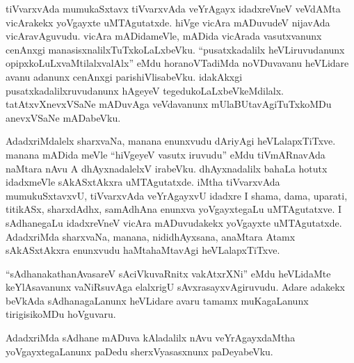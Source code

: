 tiVvarxvAda mumukaSxtavx tiVvarxvAda veYrAgayx idadxreVneV veVdAMta vicArakekx yoVgayxte uMTAgutatxde. hiVge vicAra mADuvudeV nijavAda vicAravAguvudu. vicAra mADidameVle, mADida vicArada vasutxvanunx cenAnxgi manasisxnalilxTuTxkoLaLxbeVku. ``pusatxkadalilx heVLiruvudanunx opipxkoLuLxvaMtilalxvalAlx'' eMdu horanoVTadiMda noVDuvavanu heVLidare avanu adanunx cenAnxgi parishiVlisabeVku. idakAkxgi pusatxkadalilxruvudanunx hAgeyeV tegedukoLaLxbeVkeMdilalx. tatAtxvXnevxVSaNe mADuvAga veVdavanunx mUlaBUtavAgiTuTxkoMDu anevxVSaNe mADabeVku.

AdadxriMdalelx sharxvaNa, manana enunxvudu dAriyAgi heVLalapxTiTxve. manana mADida meVle ``hiVgeyeV vasutx iruvudu'' eMdu tiVmARnavAda naMtara nAvu A dhAyxnadalelxV irabeVku. dhAyxnadalilx bahaLa hotutx idadxmeVle sAkASxtAkxra uMTAgutatxde. iMtha tiVvarxvAda mumukuSxtavxvU, tiVvarxvAda veYrAgayxvU idadxre I shama, dama, uparati, titikASx, sharxdAdhx, samAdhAna enunxva yoVgayxtegaLu uMTAgutatxve. I sAdhanegaLu idadxreVneV vicAra mADuvudakekx yoVgayxte uMTAgutatxde. AdadxriMda sharxvaNa, manana, nididhAyxsana, anaMtara Atamx sAkASxtAkxra enunxvudu haMtahaMtavAgi heVLalapxTiTxve.

``sAdhanakathanAvasareV sAciVkuvaRnitx vakAtxrXNi'' eMdu heVLidaMte keYlAsavanunx vaNiRsuvAga elalxrigU sAvxrasayxvAgiruvudu. Adare adakekx beVkAda sAdhanagaLanunx heVLidare avaru tamamx muKagaLanunx tirigisikoMDu hoVguvaru.

AdadxriMda sAdhane mADuva kAladalilx nAvu veYrAgayxdaMtha yoVgayxtegaLanunx paDedu sherxVyasasxnunx paDeyabeVku.


\endchapter
